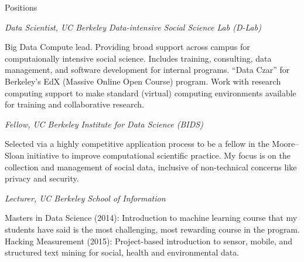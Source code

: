 \begin{rubric}{Positions}

\entry*[2013--present] \emph{Data Scientist, UC Berkeley Data-intensive Social
    Science Lab (D-Lab)}
\par Big Data Compute lead. Providing broad support across campus for
computaionally intensive social science. Includes training, consulting, data
management, and software development for internal programs. “Data Czar” for
Berkeley's EdX (Massive Online Open Course) program. Work with research
computing support to make standard (virtual) computing environments available
for training and collaborative research.

\entry*[2014--present] \emph{Fellow, UC Berkeley Institute for Data Science
    (BIDS)}
\par Selected via a highly competitive application process to be a fellow in the
Moore--Sloan initiative to improve computational scientific practice. My focus
is on the collection and management of social data, inclusive of non-technical
concerns like privacy and security.

\entry*[2014, 2015] \emph{Lecturer, UC Berkeley School of Information} 
\par Masters in Data Science (2014): Introduction to machine learning course
that my students have said is the most challenging, most rewarding course in
the program. Hacking Measurement (2015): Project-based introduction to sensor,
mobile, and structured text mining for social, health and environmental data.

\end{rubric}
